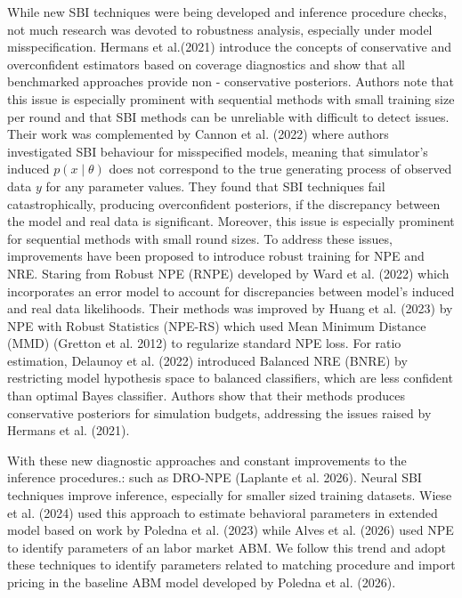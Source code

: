 \documentclass[12pt]{article}
\begin{document}
While new SBI techniques were being developed and inference procedure checks, not much research was devoted to robustness analysis, especially under model misspecification. Hermans et al.(2021) introduce the concepts of conservative and overconfident estimators based on coverage diagnostics and show that all benchmarked approaches provide non - conservative posteriors. Authors note that this issue is especially prominent with sequential methods with small training size per round and that SBI methods can be unreliable with difficult to detect issues. Their work was complemented by Cannon et al. (2022) where authors investigated SBI behaviour for misspecified models, meaning that simulator's induced $p(x \mid \theta)$ does not correspond to the true generating process of observed data $y$ for any parameter values. They found that SBI techniques fail catastrophically, producing overconfident posteriors, if the discrepancy between the model and real data is significant. Moreover, this issue is especially prominent for sequential methods with small round sizes. To address these issues, improvements have been proposed to introduce robust training for NPE and NRE. Staring from Robust NPE (RNPE) developed by Ward et al. (2022) which incorporates an error model to account for discrepancies between model's induced and real data likelihoods. Their methods was improved by Huang et al. (2023) by NPE with Robust Statistics (NPE-RS) which used Mean Minimum Distance (MMD) (Gretton et al. 2012) to regularize standard NPE loss. For ratio estimation, Delaunoy et al. (2022) introduced Balanced NRE (BNRE) by restricting model hypothesis space to balanced classifiers, which are less confident than optimal Bayes classifier. Authors show that their methods produces conservative posteriors for simulation budgets, addressing the issues raised by Hermans et al. (2021).


With these new diagnostic approaches and constant improvements to the inference procedures.: such as DRO-NPE (Laplante et al. 2026). Neural SBI techniques improve inference, especially for smaller sized training datasets. Wiese et al. (2024) used this approach to estimate behavioral parameters in extended model based on work by Poledna et al. (2023) while Alves et al. (2026) used NPE to identify parameters of an labor market ABM. We follow this trend and adopt these techniques to identify parameters related to matching procedure and import pricing in the baseline ABM model developed by Poledna et al. (2026).
\end{document}
